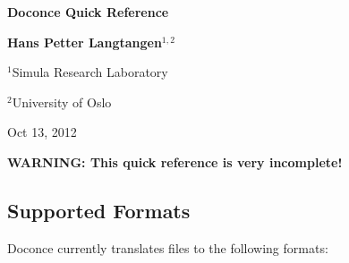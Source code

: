 \documentclass[twoside]{article}
\begin{document}





\begin{center}
{\LARGE\bf Doconce Quick Reference}
\end{center}





\begin{center}
{\bf Hans Petter Langtangen${}^{1, 2}$} \\ [0mm]
\end{center}

\begin{center}
\centerline{{\small ${}^1$Simula Research Laboratory}}
\centerline{{\small ${}^2$University of Oslo}}
\end{center}





\begin{center}
Oct 13, 2012
\end{center}

\vspace{1cm}



\tableofcontents

\vspace{1cm} %






\textbf{WARNING: This quick reference is very incomplete!}

\subsection{Supported Formats}

Doconce currently translates files to the following formats:
\end{document}
